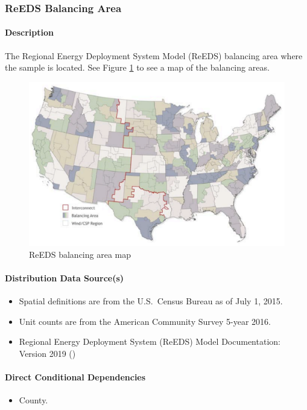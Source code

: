 \subsubsection{ReEDS Balancing Area}
\paragraph{Description}
The Regional Energy Deployment System Model (ReEDS) balancing area where the sample is located. See Figure \ref{fig:reeds_ba_map} to see a map of the balancing areas.

\begin{figure}
    \centering
    \includegraphics[width=1\linewidth]{images/reeds_ba_map.png}
    \caption{ReEDS balancing area map}
    \label{fig:reeds_ba_map}
\end{figure}

\paragraph{Distribution Data Source(s)}
\begin{itemize}
    \item Spatial definitions are from the U.S.~Census Bureau as of July 1, 2015.
    \item Unit counts are from the American Community Survey 5-year 2016.
    \item Regional Energy Deployment System (ReEDS) Model Documentation: Version 2019 (\cite{Brown2019})
    

\end{itemize}

\paragraph{Direct Conditional Dependencies}
\begin{itemize}
    \item County.
\end{itemize}
